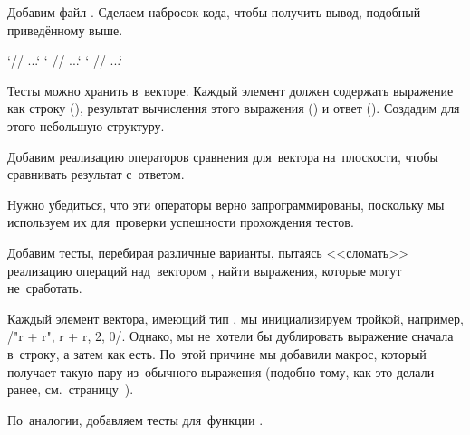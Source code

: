 
Добавим файл . Сделаем набросок кода, чтобы получить вывод, подобный приведённому выше.

\cpp`// ...`
\cpp`  // ...`
\cpp`  // ...`

Тесты можно хранить в~векторе. Каждый элемент должен содержать выражение как строку (), результат вычисления этого выражения () и ответ (). Создадим для этого небольшую структуру.


Добавим реализацию операторов сравнения для~вектора на~плоскости, чтобы сравнивать результат с~ответом.


\noindent Нужно убедиться, что эти операторы верно запрограммированы, поскольку мы используем их для~проверки успешности прохождения тестов.


Добавим тесты, перебирая различные варианты, пытаясь <<сломать>> реализацию операций над~вектором , найти выражения, которые могут не~сработать.


Каждый элемент вектора, имеющий тип , мы инициализируем тройкой, например, \cppinline/{"r + r", r + r, {2, 0}}/. Однако, мы не~хотели бы дублировать выражение сначала в~строку, а затем как есть. По~этой причине мы добавили макрос, который получает такую пару из~обычного выражения (подобно тому, как это делали ранее, см.~страницу~\pageref{par:macro}).


По~аналогии, добавляем тесты для~функции .

